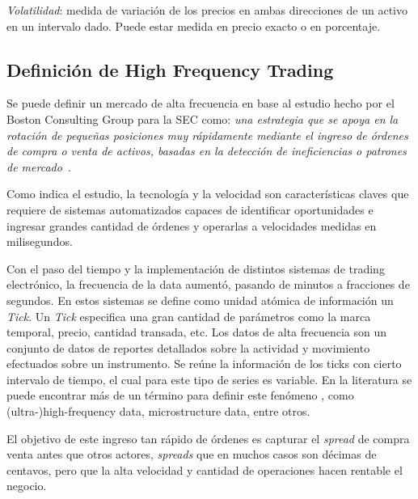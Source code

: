 \emph{Volatilidad}: medida de variación de los precios en ambas direcciones de
un activo en un intervalo dado. Puede estar medida en precio exacto o en
porcentaje.


\subsection{Definición de High Frequency Trading}

Se puede definir un mercado de alta frecuencia en base al estudio hecho por el
Boston Consulting Group para la SEC como: \emph{una estrategia que se apoya
en la rotación de pequeñas posiciones muy rápidamente mediante el ingreso de
órdenes de compra o venta de activos, basadas en la detección de ineficiencias
o patrones de mercado}~\cite{genccay2001introduction}.

Como indica el estudio, la tecnología y la velocidad son características claves
que requiere de sistemas automatizados capaces de identificar oportunidades
e ingresar grandes cantidad de órdenes y operarlas a velocidades medidas en
milisegundos.

Con el paso del tiempo y la implementación de distintos sistemas de trading
electrónico, la frecuencia de la data aumentó, pasando de minutos a fracciones
de segundos.  En estos sistemas se define como unidad atómica de información un
\emph{Tick}. Un \emph{Tick} especifica una gran cantidad de parámetros como la
marca temporal, precio, cantidad transada, etc. Los datos de alta frecuencia
son un conjunto de datos de reportes detallados sobre la actividad y movimiento
efectuados sobre un instrumento. Se reúne la información de los ticks con
cierto intervalo de tiempo, el cual para este tipo de series es variable. En la
literatura se puede encontrar más de un término para definir este fenómeno
\cite{ei2007quantitative}, como (ultra-)high-frequency data, microstructure
data, entre otros. 


El objetivo de este ingreso tan rápido de órdenes es capturar el \emph{spread}
de compra venta antes que otros actores, \emph{spreads} que en muchos casos son
décimas de centavos, pero que la alta velocidad y cantidad de operaciones hacen
rentable el negocio.

